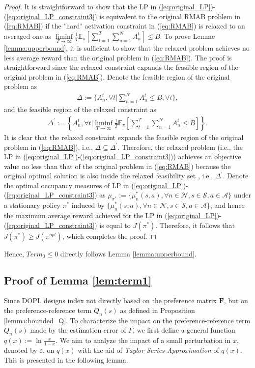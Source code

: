 \documentclass{article} %
\def\eqref#1{equation~\ref{#1}}
\newcommand{\DOPL}{\textsc{DOPL}\xspace}
\newcommand{\bF}{\mathbf{F}}
\newcommand{\cA}{\mathcal{A}}
\newcommand{\cS}{\mathcal{S}}
\newcommand{\cN}{\mathcal{N}}
\renewcommand{\eqref}[1]{(\ref{#1})}
\begin{document}
{\begin{proof}
It is straightforward to show that the LP in \eqref{eq:original_LP}-\eqref{eq:original_LP_constraint3} is equivalent to the original RMAB problem in \eqref{eq:RMAB} if the "hard" activation constraint in \eqref{eq:RMAB} is relaxed to an averaged one as  $\liminf\limits_{T\rightarrow \infty}\frac{1}{T}\mathbb{E}_{\pi}\left[\sum_{t=1}^T\sum_{n=1}^N A_n^{t}\right]\leq B$.
To prove Lemme \ref{lemma:upperbound},
it is sufficient to show that the relaxed problem achieves no less average reward than the original problem in \eqref{eq:RMAB}.
The proof is straightforward since the relaxed constraint expands the feasible region of the original problem in \eqref{eq:RMAB}. Denote the feasible region of the original problem  as
\begin{align}
    \Delta:=\Bigg\{A_n^{t}, \forall  t\Bigg\vert\sum_{n=1}^{N}A_n^{t}\leq B, \forall t\Bigg\},
\end{align}
and the feasible region of the relaxed constraint as 
\begin{align}
\Delta^\prime:=\left\{A_n^{t}, \forall t\Bigg\vert\liminf_{T\rightarrow\infty}\frac{1}{T}\mathbb{E}_{\pi}\left[\sum_{t=1}^T\sum_{n=1}^{N}A_n^{t}\leq B\right]\right\}.
\end{align}
It is clear that the relaxed constraint expands the feasible region of the original problem in \eqref{eq:RMAB}, i.e., $\Delta\subseteq\Delta^\prime.$  Therefore, the relaxed problem (i.e., the LP in \eqref{eq:original_LP}-\eqref{eq:original_LP_constraint3}) achieves an objective value no less than that of the original problem in \eqref{eq:RMAB} because the original optimal solution is also inside the relaxed feasibility set \citep{altman1999constrained}, i.e., $\Delta^\prime$. Denote the optimal occupancy measures of LP in \eqref{eq:original_LP}-\eqref{eq:original_LP_constraint3} as $\mu_{\pi^*}:=\{\mu^*_n(s,a), \forall n\in\cN, s\in\cS, a\in\cA\}$ under a stationary policy $\pi^*$ induced by $\{\mu^*_n(s,a), \forall n\in\cN, s\in\cS, a\in\cA\}$, and hence the maximum average reward achieved for the LP in \eqref{eq:original_LP}-\eqref{eq:original_LP_constraint3} is equal to $J(\pi^*)$. Therefore, it follows that $J(\pi^*)\geq J(\pi^{opt})$, which completes the proof.
\end{proof}
Hence, $Term_0\leq 0$ directly follows Lemma \ref{lemma:upperbound}.



\subsection{Proof of Lemma \ref{lem:term1}}
Since \DOPL designs index not directly based on the preference matrix $\bF$, but on the preference-reference term $Q_n(s)$ as defined in Proposition \ref{lemma:bounded_Q}. 
To characterize the impact on the preference-reference term $Q_n(s)$ made by the estimation error of $F$,  we first define a general function $q(x):=\ln\frac{x}{1-x}$. 
We aim to analyze the impact of a small perturbation in $x$, denoted by $\varepsilon$, on $q(x)$ with the aid of \emph{Taylor Series Approximation} of $q(x)$. This is presented in the following lemma.

}
\end{document}
